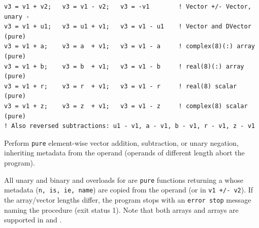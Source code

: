 

\lstset{language=[95]Fortran}
\begin{lstlisting}
v3 = v1 + v2;   v3 = v1 - v2;   v3 = -v1        ! Vector +/- Vector, unary -
v3 = v1 + u1;   v3 = u1 + v1;   v3 = v1 - u1    ! Vector and DVector (pure)
v3 = v1 + a;    v3 = a  + v1;   v3 = v1 - a     ! complex(8)(:) array (pure)
v3 = v1 + b;    v3 = b  + v1;   v3 = v1 - b     ! real(8)(:) array (pure)
v3 = v1 + r;    v3 = r  + v1;   v3 = v1 - r     ! real(8) scalar (pure)
v3 = v1 + z;    v3 = z  + v1;   v3 = v1 - z     ! complex(8) scalar (pure)
! Also reversed subtractions: u1 - v1, a - v1, b - v1, r - v1, z - v1
\end{lstlisting}

Perform \texttt{pure} element-wise vector addition, subtraction, or unary negation, inheriting metadata from the  operand (operands of different length abort the program).

All unary and binary \procname{+} and \procname{-} overloads for  are \texttt{pure} functions returning a  whose metadata (\texttt{n, is, ie, name}) are copied from the  operand (or  in \texttt{v1 +/- v2}). If the array/vector lengths differ, the program stops with an \texttt{error stop} message naming the procedure (exit status 1). Note that both  arrays  and  arrays  are supported in \procname{+} and \procname{-}.


\begin{description}[leftmargin=2.2cm, style=nextline]
\end{description}

